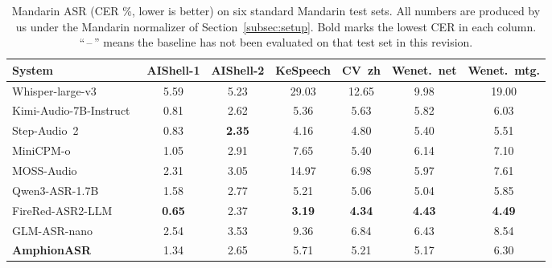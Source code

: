 \begin{table}[t]
  \caption{Mandarin ASR (CER \%, lower is better) on six standard
    Mandarin test sets. All numbers are produced by us under the
    Mandarin normalizer of Section~\ref{subsec:setup}. Bold marks
    the lowest CER in each column. ``\,--\,'' means the baseline
    has not been evaluated on that test set in this revision.}
  \label{tab:asr_zh}
  \centering
  \small
  \setlength{\tabcolsep}{4pt}
  \begin{tabular}{lcccccc}
    \toprule
    System & AIShell-1 & AIShell-2 & KeSpeech & CV~zh & Wenet.~net & Wenet.~mtg. \\
    \midrule
    Whisper-large-v3~\cite{radford2023whisper} & 5.59 & 5.23 & 29.03 & 12.65 & 9.98 & 19.00 \\
    Kimi-Audio-7B-Instruct~\cite{kimiaudio2025} & 0.81 & 2.62 & 5.36 & 5.63 & 5.82 & 6.03 \\
    Step-Audio~2~\cite{stepaudio22025} & 0.83 & \textbf{2.35} & 4.16 & 4.80 & 5.40 & 5.51 \\
    MiniCPM-o~\cite{minicpm2025} & 1.05 & 2.91 & 7.65 & 5.40 & 6.14 & 7.10 \\
    MOSS-Audio~\cite{moss2026audio} & 2.31 & 3.05 & 14.97 & 6.98 & 5.97 & 7.61 \\
    Qwen3-ASR-1.7B~\cite{qwen2025qwen3asr} & 1.58 & 2.77 & 5.21 & 5.06 & 5.04 & 5.85 \\
    FireRed-ASR2-LLM~\cite{fireredasr2025} & \textbf{0.65} & 2.37 & \textbf{3.19} & \textbf{4.34} & \textbf{4.43} & \textbf{4.49} \\
    GLM-ASR-nano~\cite{glmasr2025} & 2.54 & 3.53 & 9.36 & 6.84 & 6.43 & 8.54 \\
    \midrule
    \textbf{AmphionASR} & 1.34 & 2.65 & 5.71 & 5.21 & 5.17 & 6.30 \\
    \bottomrule
  \end{tabular}
\end{table}
